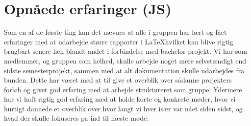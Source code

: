 \chapter{Opnåede erfaringer (JS)}

Som en af de første ting kan det nævnes at alle i gruppen har lært og fået erfaringer med at udarbejde større rapporter i \LaTeX  hvilket kan blive rigtig brugbart senere hen blandt andet i forbindelse med bachelor projekt.\newline
Vi har som medlemmer, og gruppen som helhed, skulle arbejde noget mere selvstændigt end sidste semesterprojekt, sammen med at alt dokumentation skulle udarbejdes fra bunden. Dette har været med at til give et overblik over sådanne projekters forløb og givet god erfaring med at arbejde struktureret som gruppe. Ydermere har vi haft rigtig god erfaring med at holde korte og konkrete møder, hvor vi hurtigt dannede et overblik over hvor langt vi hver især var nået siden sidst, og hvad der skulle fokuseres på ind til næste møde.
